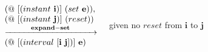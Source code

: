 \newcommand{\lam}[2]{\lambda#1.\,#2}

\begin{flushleft}

$\begin{array}{l}
\begin{array}{l}
  (@~[(instant~\mathbf{i})]~(set~\mathbf{e})),\\
  (@~[(instant~\mathbf{j})]~(reset))\\
  \xrightarrow{\hspace*{1cm}\mathbf{expand-set}\hspace*{1cm}}\\
  (@~[(interval~[\mathbf{i}~\mathbf{j}])]~\mathbf{e})\\

  
\end{array}\\[0.1cm]

\end{array}$
\hfill given no $reset$ from $\mathbf{i}$ to $\mathbf{j}$

\end{flushleft}
